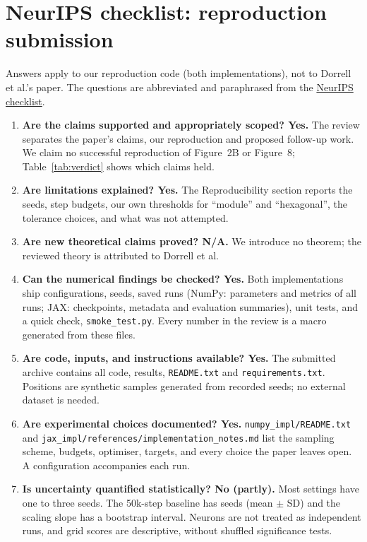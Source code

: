 \section*{NeurIPS checklist: reproduction submission}
\noindent Answers apply to our reproduction code (both implementations), not to Dorrell et al.'s paper. The questions are abbreviated and paraphrased from the \href{https://neurips.cc/public/guides/PaperChecklist}{NeurIPS checklist}.
\begin{enumerate}[leftmargin=1.6em,itemsep=2pt]\raggedright
\item \textbf{Are the claims supported and appropriately scoped? Yes.} The review separates the paper's claims, our reproduction and proposed follow-up work. We claim no successful reproduction of Figure~2B or Figure~8; Table~\ref{tab:verdict} shows which claims held.
\item \textbf{Are limitations explained? Yes.} The Reproducibility section reports the seeds, step budgets, our own thresholds for ``module'' and ``hexagonal'', the tolerance choices, and what was not attempted.
\item \textbf{Are new theoretical claims proved? N/A.} We introduce no theorem; the reviewed theory is attributed to Dorrell et al.
\item \textbf{Can the numerical findings be checked? Yes.} Both implementations ship configurations, seeds, saved runs (NumPy: parameters and metrics of all \nJobs{} runs; JAX: checkpoints, metadata and evaluation summaries), unit tests, and a quick check, \texttt{smoke\_test.py}. Every number in the review is a macro generated from these files.
\item \textbf{Are code, inputs, and instructions available? Yes.} The submitted archive contains all code, results, \texttt{README.txt} and \texttt{requirements.txt}. Positions are synthetic samples generated from recorded seeds; no external dataset is needed.
\item \textbf{Are experimental choices documented? Yes.} \texttt{numpy\_impl/README.txt} and \texttt{jax\_impl/references/implementation\_notes.md} list the sampling scheme, budgets, optimiser, targets, and every choice the paper leaves open. A configuration accompanies each run.
\item \textbf{Is uncertainty quantified statistically? No (partly).} Most settings have one to three seeds. The 50k-step baseline has \baseSeeds{} seeds (mean $\pm$ SD) and the scaling slope has a bootstrap interval. Neurons are not treated as independent runs, and grid scores are descriptive, without shuffled significance tests.

\end{enumerate}

